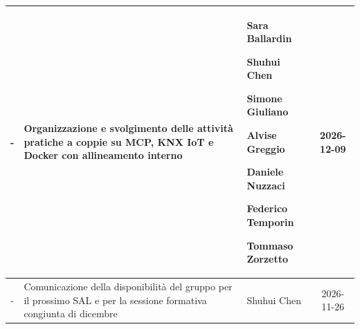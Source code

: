 \documentclass[11pt, a4paper]{article}
\begin{document}
\begin{table}[h]
\begin{tabularx}{\textwidth}{|c|>{\raggedright\arraybackslash}X|>{\centering\arraybackslash}p{3.5cm}|c|}
        \hline
        - & Organizzazione e svolgimento delle attività pratiche a coppie su MCP, KNX IoT e Docker con allineamento interno & Sara Ballardin \par Shuhui Chen \par Simone Giuliano \par Alvise Greggio \par Daniele Nuzzaci \par Federico Temporin \par Tommaso Zorzetto & 2026-12-09 \\
        \hline
        - & Comunicazione della disponibilità del gruppo per il prossimo SAL e per la sessione formativa congiunta di dicembre & Shuhui Chen & 2026-11-26 \\
        \hline
    \end{tabularx}
\end{table}
\end{document}
